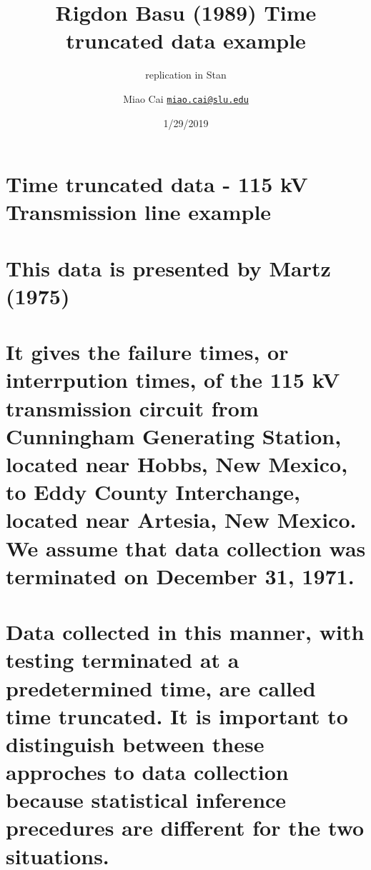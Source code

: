 \documentclass[]{article}
\title{Rigdon Basu (1989) Time truncated data example}
\subtitle{replication in Stan}
\author{Miao Cai \href{mailto:miao.cai@slu.edu}{\nolinkurl{miao.cai@slu.edu}}}
\date{1/29/2019}
\begin{document}
\maketitle

\hypertarget{time-truncated-data---115-kv-transmission-line-example}{%
\section{Time truncated data - 115 kV Transmission line
example}\label{time-truncated-data---115-kv-transmission-line-example}}

\hypertarget{this-data-is-presented-by-martz-1975}{%
\section{This data is presented by Martz
(1975)}\label{this-data-is-presented-by-martz-1975}}

\hypertarget{it-gives-the-failure-times-or-interrpution-times-of-the-115-kv-transmission-circuit-from-cunningham-generating-station-located-near-hobbs-new-mexico-to-eddy-county-interchange-located-near-artesia-new-mexico.-we-assume-that-data-collection-was-terminated-on-december-31-1971.}{%
\section{It gives the failure times, or interrpution times, of the 115
kV transmission circuit from Cunningham Generating Station, located near
Hobbs, New Mexico, to Eddy County Interchange, located near Artesia, New
Mexico. We assume that data collection was terminated on December 31,
1971.}\label{it-gives-the-failure-times-or-interrpution-times-of-the-115-kv-transmission-circuit-from-cunningham-generating-station-located-near-hobbs-new-mexico-to-eddy-county-interchange-located-near-artesia-new-mexico.-we-assume-that-data-collection-was-terminated-on-december-31-1971.}}

\hypertarget{data-collected-in-this-manner-with-testing-terminated-at-a-predetermined-time-are-called-time-truncated.-it-is-important-to-distinguish-between-these-approches-to-data-collection-because-statistical-inference-precedures-are-different-for-the-two-situations.}{%
\section{Data collected in this manner, with testing terminated at a
predetermined time, are called time truncated. It is important to
distinguish between these approches to data collection because
statistical inference precedures are different for the two
situations.}\label{data-collected-in-this-manner-with-testing-terminated-at-a-predetermined-time-are-called-time-truncated.-it-is-important-to-distinguish-between-these-approches-to-data-collection-because-statistical-inference-precedures-are-different-for-the-two-situations.}}
\end{document}
